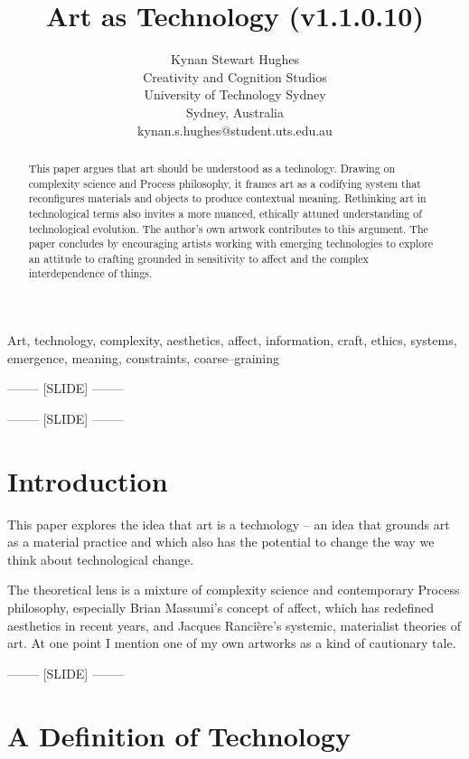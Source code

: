 \documentclass[letter:wpaper]{article}
\title{Art as Technology (v1.1.0.10)}
\author{Kynan Stewart Hughes\\
Creativity and Cognition Studios\\
University of Technology Sydney\\
Sydney, Australia\\
kynan.s.hughes@student.uts.edu.au\\
\newline
\newline
}
\begin{document}
 
\maketitle
\begin{abstract}
    This paper argues that art should be understood as a technology. Drawing on complexity science and Process philosophy, it frames art as a codifying system that reconfigures materials and objects to produce contextual meaning. Rethinking art in technological terms also invites a more nuanced, ethically attuned understanding of technological evolution. The author’s own artwork contributes to this argument. The paper concludes by encouraging artists working with emerging technologies to explore an attitude to crafting grounded in sensitivity to affect and the complex interdependence of things.
\end{abstract}


Art, technology, complexity, aesthetics, affect, information, craft, ethics, systems, emergence, meaning, constraints, coarse–graining

-------- [SLIDE] --------

-------- [SLIDE] --------

\section{Introduction}

    This paper explores the idea that art is a technology \citep[pp.74–75]{SauvagnarguesArtmchns2016} \citep{GellThTchnlgyOfEnchntmnt1992} \citep[p.202]{OSullivanFrmAsthtcsToThAbstrctMchn2010} -- an idea that grounds art as a material practice and which also has the potential to change the way we think about technological change. 
    
    The theoretical lens is a mixture of complexity science and contemporary Process philosophy, especially Brian Massumi's concept of affect, which has redefined aesthetics in recent years, and Jacques Rancière's systemic, materialist theories of art. At one point I mention one of my own artworks as a kind of cautionary tale.

-------- [SLIDE] --------

\section{A Definition of Technology} 
\end{document}
